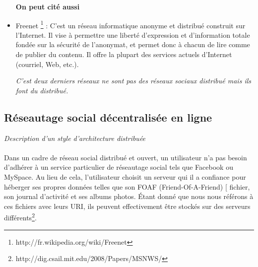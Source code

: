 \begin{itemize}
\textbf{On peut cité aussi }
\item Freenet \footnote{http://fr.wikipedia.org/wiki/Freenet} : C'est un réseau informatique anonyme et distribué construit sur l'Internet. Il vise à permettre une liberté d'expression et d'information totale fondée sur la sécurité de l'anonymat, et permet donc à chacun de lire comme de publier du contenu. Il offre la plupart des services actuels d'Internet (courriel, Web, etc.). 

\textit{C'est deux derniers réseaux ne sont pas des réseaux sociaux distribué mais ils font du distribué. }
\end{itemize}
\subsection{Réseautage social décentralisée en ligne}
\textit{Description d'un style d'architecture distribuée}\newline
\paragraph{}
Dans un cadre de réseau social distribué et ouvert, un utilisateur n'a pas besoin d'adhérer à un service particulier de réseautage social tels que Facebook ou MySpace. Au lieu de cela, l'utilisateur choisit un serveur qui il a confiance pour héberger ses propres données telles que son FOAF (Friend-Of-A-Friend) [ fichier, son journal d'activité et ses albums photos. Étant donné que nous nous référons à ces fichiers avec leurs URI, ils peuvent effectivement être stockés sur des serveurs différents\footnote{http://dig.csail.mit.edu/2008/Papers/MSNWS/}.

